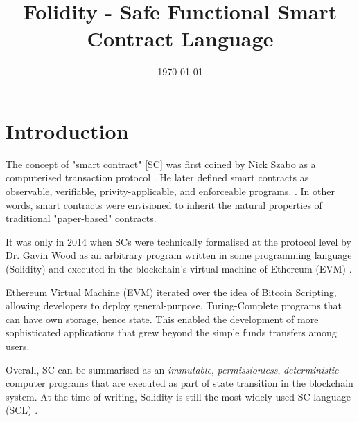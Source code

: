 \documentclass[oneside]{ecsproject}     %
\begin{document}
\frontmatter
\title      {Folidity - Safe Functional Smart Contract Language}
\addresses  {\groupname\\\deptname\\\univname}
\date       {\today}
\subject    {}
\keywords   {}
\maketitle
\tableofcontents
\mainmatter

\chapter{Introduction}

The concept of "smart contract" [SC] was first coined by Nick Szabo as a computerised transaction protocol \cite{nz_sc}.
He later defined smart contracts as observable, verifiable, privity-applicable, and enforceable programs. \cite{nz_sc_bb}.
In other words, smart contracts were envisioned to inherit the natural properties of traditional "paper-based" contracts.

It was only in 2014 when SCs were technically formalised at the protocol level by Dr. Gavin Wood as an arbitrary program
written in some programming language (Solidity) and executed in the blockchain's virtual machine of Ethereum (EVM) \cite{eth_yellow_paper}.

Ethereum Virtual Machine (EVM) iterated over the idea of Bitcoin Scripting, allowing developers to deploy general-purpose, Turing-Complete
programs that can have own storage, hence state. This enabled the development of more sophisticated applications that grew beyond
the simple funds transfers among users.

Overall, SC can be summarised as an \textit{immutable}, \textit{permissionless}, \textit{deterministic} computer programs 
that are executed as part of state transition in the blockchain system. 
At the time of writing, Solidity is still the most widely used SC language (SCL) \cite{sc_survey}.
\end{document}
